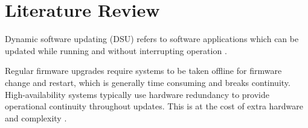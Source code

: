\graphicspath{{main/review/graphics/}}

\chapter{Literature Review}




Dynamic software updating (DSU) refers to software applications which can be updated while running and without interrupting operation \autocite{hicksDynamicSoftwareUpdating2005}.

Regular firmware upgrades require systems to be taken offline for firmware change and restart, which is generally time consuming and breaks continuity. High-availability systems typically use hardware redundancy to provide operational continuity throughout updates. This is at the cost of extra hardware and complexity \autocite{raoLiveSeamlessFirmware2023}.

